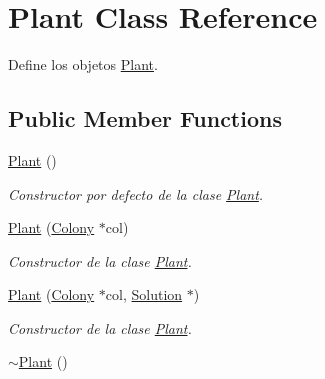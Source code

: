 \hypertarget{class_plant}{\section{Plant Class Reference}
\label{class_plant}
}


Define los objetos \hyperlink{class_plant}{Plant}.  


\subsection*{Public Member Functions}
\begin{DoxyCompactItemize}
\item 
\hypertarget{class_plant_aeebba67fbf33e3087e9035f41289a83a}{\hyperlink{class_plant_aeebba67fbf33e3087e9035f41289a83a}{Plant} ()}\label{class_plant_aeebba67fbf33e3087e9035f41289a83a}

\begin{DoxyCompactList}\small\item\em Constructor por defecto de la clase \hyperlink{class_plant}{Plant}. \end{DoxyCompactList}\item 
\hyperlink{class_plant_ae4e71ef08f69aa77ed93eba7e8398ff4}{Plant} (\hyperlink{class_colony}{Colony} $\ast$col)
\begin{DoxyCompactList}\small\item\em Constructor de la clase \hyperlink{class_plant}{Plant}. \end{DoxyCompactList}\item 
\hyperlink{class_plant_adf981553a347cc9f2769c94e3fdf5165}{Plant} (\hyperlink{class_colony}{Colony} $\ast$col, \hyperlink{class_solution}{Solution} $\ast$)
\begin{DoxyCompactList}\small\item\em Constructor de la clase \hyperlink{class_plant}{Plant}. \end{DoxyCompactList}\item 
\hypertarget{class_plant_ab0effb2b143e6da7b65ebd13a3b1fc29}{\hyperlink{class_plant_ab0effb2b143e6da7b65ebd13a3b1fc29}{$\sim$\+Plant} ()}\label{class_plant_ab0effb2b143e6da7b65ebd13a3b1fc29}


\end{DoxyCompactItemize}
